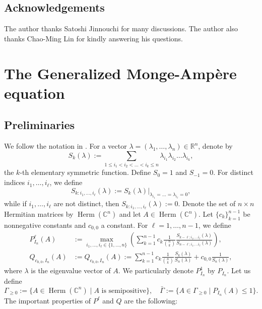 \documentclass[10pt,a4paper]{amsart}
\numberwithin{equation}{section}
\begin{document}
\subsection*{Acknowledgements}
The author thanks Satoshi Jinnouchi for many discussions. The author also thanks Chao-Ming Lin for kindly answering his questions.

\section{The Generalized Monge-Ampère equation}\label{sec:gMA}
\subsection{Preliminaries}\label{subsec:pre}
We follow the notation in \cite{CS17}. For a vector $\lambda=(\lambda_1,\dots,\lambda_n)\in\mathbb{R}^n$, denote by 
\begin{equation*}
    S_k(\lambda):=\sum_{1\le i_1<i_2<\dots<i_k\le n}\lambda_{i_1}\lambda_{i_2}\dots\lambda_{i_k},
\end{equation*}
the $k$-th elementary symmetric function. Define $S_0=1$ and $S_{-1}=0$. For distinct indices $i_1,\dots, i_\ell$, we define
\begin{equation*}
    S_{k:i_1,\dots,i_\ell}(\lambda):=S_k(\lambda)|_{\lambda_{i_1}=\dots=\lambda_{i_\ell}=0},
\end{equation*}
while  if $i_1,\dots, i_\ell$ are not distinct, then $S_{k:i_1,\dots,i_\ell}(\lambda):=0$.
Denote the set of $n\times n$ Hermitian matrices by $\operatorname{Herm}(\mathbb{C}^n)$ and let $A\in\operatorname{Herm}(\mathbb{C}^n)$. Let $\{c_k\}_{k=1}^{n-1}$ be nonnegative constants and $c_{0,0}$ a constant. 
For $\ell=1,\dots,n-1$, we define
\begin{align*}
    P^\ell_{I_n}(A)&:=\max_{i_1,\dots,i_\ell\in\{1,\dots,n\}} \left(\sum_{k=1}^{n-1} c_k\frac{1}{{n\choose k}}\frac{S_{k-\ell;i_1,\dots i_\ell}(\lambda)}{S_{n-\ell;i_1,\dots i_\ell}(\lambda)}\right),\\
    Q_{c_{0,0},I_n}(A)&:=Q_{c_{0,0},I_n}(A) := \sum_{k=1}^{n-1}c_k\frac{1}{{n\choose k}}\frac{S_k(\lambda)}{S_n(\lambda)}+c_{0,0}\frac{1}{S_n(\lambda)},
\end{align*}
where $\lambda$ is the eigenvalue vector of $A$. We particularly denote $P^1_{I_n}$ by $P_{I_n}$.
Let us define 
\begin{equation*}
    \Gamma_{\ge0}:=\{A\in\operatorname{Herm}(\mathbb{C}^n)\mid A \text{ is semipositive}\},\quad \bar{\Gamma}:=\{A\in \Gamma_{\ge0}\mid P_{I_n}(A)\le1 \}.
\end{equation*}
The important properties of $P^\ell$ and $Q$ are the following:
\end{document}
